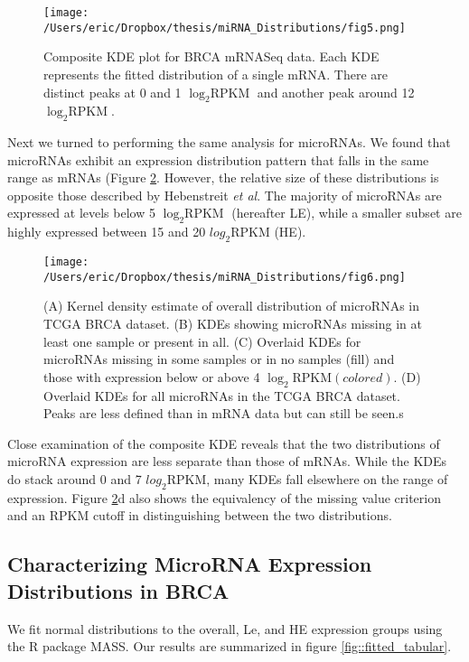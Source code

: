 \documentclass[12pt]{report}
\begin{document}
\begin{figure}[H]
\centering
 \texttt{[image: /Users/eric/Dropbox/thesis/miRNA\_Distributions/fig5.png]}
 \caption{Composite KDE plot for BRCA mRNASeq data. Each KDE represents the fitted distribution of a single mRNA. There are distinct peaks at 0 and 1 $\log_{2} \text{RPKM}$ and another peak around 12 $\log_{2} \text{RPKM}$.}
 \label{fig::brca_mrna_kde}
\end{figure}



Next we turned to performing the same analysis for microRNAs. We found that microRNAs exhibit an expression distribution pattern that falls in the same range as mRNAs (Figure \ref{fig::brca_mirna_kde}. However,
the relative size of these distributions is opposite those described by Hebenstreit \textit{et al}. The majority of microRNAs are expressed at levels below 5 $\log_{2} \text{RPKM}$ (hereafter LE), while a smaller subset are highly expressed
between 15 and 20 $log_{2} \text{RPKM}$ (HE).

\begin{figure}[H]
\centering
\texttt{[image: /Users/eric/Dropbox/thesis/miRNA\_Distributions/fig6.png]}
\caption{(A) Kernel density estimate of overall distribution of microRNAs in TCGA BRCA dataset.
(B) KDEs showing microRNAs missing in at least one sample or present in all.
(C) Overlaid KDEs for microRNAs missing in some samples or in no samples (fill) 
and those with expression below or above 4 $\log_{2} \text{RPKM} (colored)$.
(D) Overlaid KDEs for all microRNAs in the TCGA BRCA dataset. Peaks are less 
defined than in mRNA data but can still be seen.s
}
 \label{fig::brca_mirna_kde}
\end{figure}


Close examination of the composite KDE reveals that the two distributions of microRNA expression are less separate than those of mRNAs. While the KDEs do stack around 0 and 7 $log_{2} \text{RPKM}$, many KDEs fall
elsewhere on the range of expression. Figure \ref{fig::brca_mirna_kde}d also shows the equivalency of the missing value criterion and an RPKM cutoff in distinguishing between the two distributions.

\subsection*{Characterizing MicroRNA Expression Distributions in BRCA}
  We fit normal distributions to the overall, Le, and HE expression groups using the R package MASS. Our results are summarized in figure \ref{fig::fitted_tabular}.
  
\end{document}
